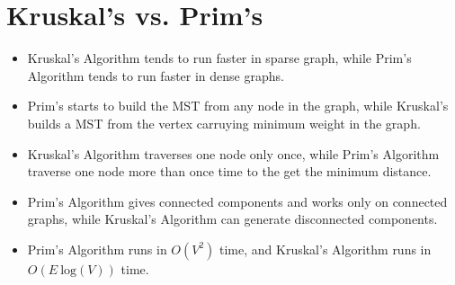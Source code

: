 \documentclass[12pt]{article}
\theoremstyle{definition}
\begin{document}
\section{Kruskal's vs. Prim's}

\begin{itemize}
	\item Kruskal's Algorithm tends to run faster in sparse graph, while Prim's Algorithm tends to run faster in dense graphs.
	\item Prim's starts to build the MST from any node in the graph, while Kruskal's builds a MST from the vertex carruying minimum weight in the graph.
	\item Kruskal's Algorithm traverses one node only once, while Prim's Algorithm traverse one node more than once time to the get the minimum distance.
	\item Prim's Algorithm gives connected components and works only on connected graphs, while Kruskal's Algorithm can generate disconnected components.
	\item Prim's Algorithm runs in $O(V^2)$ time, and Kruskal's Algorithm runs in $O(E \ \textrm{log}(V))$ time.
\end{itemize}
\end{document}
